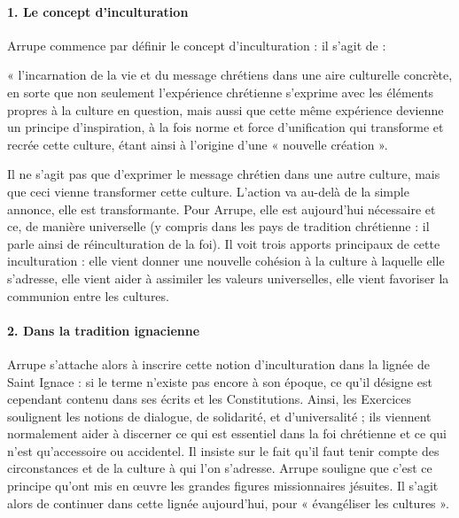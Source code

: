  \paragraph{1.	Le concept d’inculturation
}

Arrupe commence par définir le concept d’inculturation : il s’agit de :
\begin{Def}[Inculturation]
    « l’incarnation de la vie et du message chrétiens dans une aire culturelle concrète, en sorte que non seulement l’expérience chrétienne s’exprime avec les éléments propres à la culture en question, mais aussi que cette même expérience devienne un principe d’inspiration, à la fois norme et force d’unification qui transforme et recrée cette culture, étant ainsi à l’origine d’une « nouvelle création ».
\end{Def}



 
 Il ne s’agit pas que d’exprimer le message chrétien dans une autre culture, mais que ceci vienne transformer cette culture. L’action va au-delà de la simple annonce, elle est transformante.
Pour Arrupe, elle est aujourd’hui nécessaire et ce, de manière universelle (y compris dans les pays de tradition chrétienne : il parle ainsi de réinculturation de la foi). Il voit trois apports principaux de cette inculturation : elle vient donner une nouvelle cohésion à la culture à laquelle elle s’adresse, elle vient aider à assimiler les valeurs universelles, elle vient favoriser la communion entre les cultures.

\paragraph{2.	Dans la tradition ignacienne
}

Arrupe s’attache alors à inscrire cette notion d’inculturation dans la lignée de Saint Ignace : si le terme n’existe pas encore à son époque, ce qu’il désigne est cependant contenu dans ses écrits et les Constitutions. Ainsi, les Exercices soulignent les notions de dialogue, de solidarité, et d’universalité ; ils viennent normalement aider à discerner ce qui est essentiel dans la foi chrétienne et ce qui n’est qu’accessoire ou accidentel. Il insiste sur le fait qu’il faut tenir compte des circonstances et de la culture à qui l’on s’adresse. Arrupe souligne que c’est ce principe qu’ont mis en œuvre les grandes figures missionnaires jésuites. Il s’agit alors de continuer dans cette lignée aujourd’hui, pour « évangéliser les cultures ».

